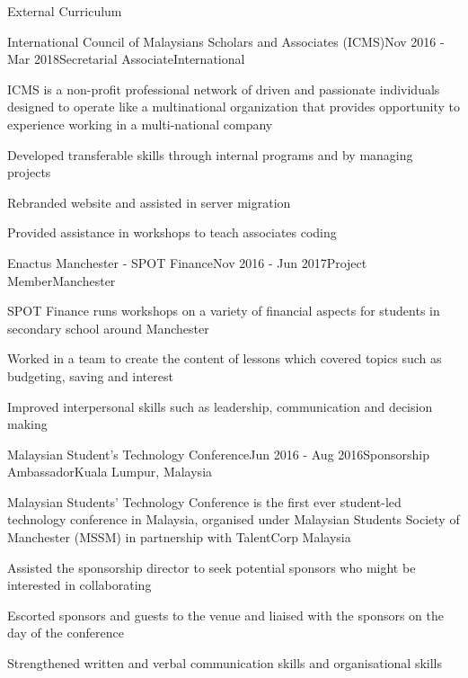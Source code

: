 \documentclass{techresume} %
\begin{document}

\begin{rSection}{External Curriculum}

\begin{rSubsection}{International Council of Malaysians Scholars and Associates (ICMS)}{Nov 2016 - Mar 2018}{Secretarial Associate}{International}
\item ICMS is a non-profit professional network of driven and passionate individuals designed to operate like a multinational organization that provides opportunity to experience working in a multi-national company
\item Developed transferable skills through internal programs and by managing projects
\item Rebranded website and assisted in server migration
\item Provided assistance in workshops to teach associates coding
\end{rSubsection}

\begin{rSubsection}{Enactus Manchester - SPOT Finance}{Nov 2016 - Jun 2017}{Project Member}{Manchester}
\item SPOT Finance runs workshops on a variety of financial aspects for students in secondary school around Manchester
\item Worked in a team to create the content of lessons which covered topics such as budgeting, saving and interest
\item Improved interpersonal skills such as leadership, communication and decision making
\end{rSubsection}

\begin{rSubsection}{Malaysian Student's Technology Conference}{Jun 2016 - Aug 2016}{Sponsorship Ambassador}{Kuala Lumpur, Malaysia}
\item Malaysian Students’ Technology Conference is the first ever student-led technology conference in Malaysia, organised under Malaysian Students Society of Manchester (MSSM) in partnership with TalentCorp Malaysia
\item Assisted the sponsorship director to seek potential sponsors who might be interested in collaborating
\item Escorted sponsors and guests to the venue and liaised with the sponsors on the day of the conference
\item Strengthened written and verbal communication skills and organisational skills
\end{rSubsection}

\end{rSection}
\end{document}
